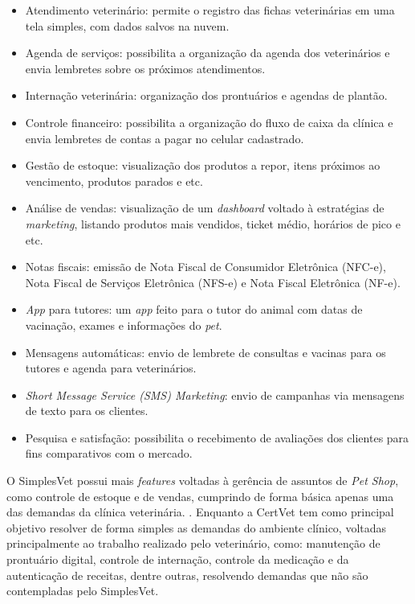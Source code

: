 \documentclass[
    12pt,               %
    openright,          %
    oneside,
    a4paper,            %
    BIBLATEX,           %
    TODO,               %
    english,            %
    brazil              %
    ]{ifsp-spo-inf-ctds}
\begin{document}
\begin{itemize}

    \item Atendimento veterinário: permite o registro das fichas veterinárias em uma tela simples, com dados salvos na nuvem.
    \item Agenda de serviços: possibilita a organização da agenda dos veterinários e envia lembretes sobre os próximos atendimentos.
    \item Internação veterinária: organização dos prontuários e agendas de plantão.
    \item Controle financeiro: possibilita a organização do fluxo de caixa da clínica e envia lembretes de contas a pagar no celular cadastrado.
    \item Gestão de estoque: visualização dos produtos a repor, itens próximos ao vencimento, produtos parados e etc.
    \item Análise de vendas: visualização de um \emph{dashboard} voltado à estratégias de \emph{marketing}, listando produtos mais vendidos, ticket médio, horários de pico e etc.
    \item Notas fiscais: emissão de Nota Fiscal de Consumidor Eletrônica (NFC-e), Nota Fiscal de Serviços Eletrônica (NFS-e) e Nota Fiscal Eletrônica (NF-e).
    \item \emph{App} para tutores: um \emph{app} feito para o tutor do animal com datas de vacinação, exames e informações do \emph{pet}.
    \item Mensagens automáticas: envio de lembrete de consultas e vacinas para os tutores e agenda para veterinários.
    \item \emph{Short Message Service (SMS) Marketing}: envio de campanhas via mensagens de texto para os clientes.
    \item Pesquisa e satisfação: possibilita o recebimento de avaliações dos clientes para fins comparativos com o mercado.
\end{itemize}

    O SimplesVet possui mais \emph{features} voltadas à gerência de assuntos de \emph{Pet Shop}, como controle de estoque e de vendas, cumprindo de forma básica apenas uma das demandas da clínica veterinária.  . Enquanto a CertVet tem como principal objetivo resolver de forma simples as demandas do ambiente clínico, voltadas principalmente ao trabalho realizado pelo veterinário, como: manutenção de prontuário digital, controle de internação, controle da medicação e da autenticação de receitas, dentre outras, resolvendo demandas que não são contempladas pelo SimplesVet.
\end{document}
